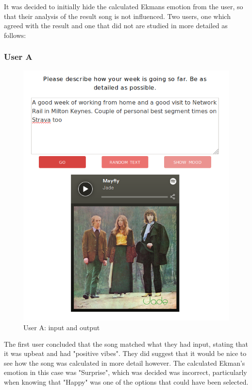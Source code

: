 It was decided to initially hide the calculated Ekmans emotion from the user, so that their analysis of the result song is not influenced. 
Two users, one which agreed with the result and one that did not are studied in more detailed as follows:

\subsubsection{User A}

\begin{figure}[h]
\centering
\includegraphics[scale=0.4]{implementation/malc-user.png}
\caption{User A: input and output}
\label{user:1}
\end{figure}

The first user concluded that the song matched what they had input, stating that it was upbeat and had "positive vibes". They did suggest that it would be nice to see how the song was calculated in more detail however. The calculated Ekman's emotion in this case was "Surprise", which was decided was incorrect, particularly when knowing that "Happy" was one of the options that could have been selected.

